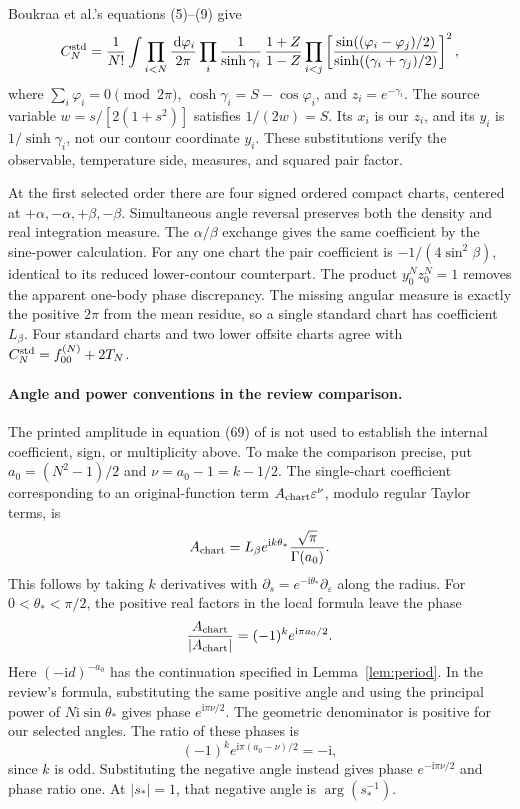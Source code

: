 \documentclass[11pt]{article}
\numberwithin{equation}{section}
\theoremstyle{definition}
\newcommand{\dd}{\,\mathrm d}
\newcommand{\ii}{\mathrm i}
\newcommand{\eps}{\varepsilon}
\begin{document}
Boukraa et al.'s equations (5)--(9) \cite{Boukraa2008} give
\[
 C_N^{\rm std}=\frac1{N!}
 \int\prod_{i<N}\frac{\dd\varphi_i}{2\pi}
 \prod_i\frac1{\sinh\gamma_i}\,
 \frac{1+Z}{1-Z}
 \prod_{i<j}\left[
  \frac{\sin((\varphi_i-\varphi_j)/2)}
       {\sinh((\gamma_i+\gamma_j)/2)}
             \right]^2 ,
\]
where \(\sum_i\varphi_i=0\pmod{2\pi}\),
\(\cosh\gamma_i=S-\cos\varphi_i\), and \(z_i=e^{-\gamma_i}\).
The source variable \(w=s/[2(1+s^2)]\) satisfies \(1/(2w)=S\).
Its \(x_i\) is our \(z_i\), and its \(y_i\) is
\(1/\sinh\gamma_i\), not our contour coordinate \(y_i\).
These substitutions verify the observable, temperature side,
measures, and squared pair factor.

At the first selected order there are four signed ordered compact
charts, centered at \(+\alpha,-\alpha,+\beta,-\beta\).
Simultaneous angle reversal preserves both the density and real
integration measure. The \(\alpha/\beta\) exchange gives the same
coefficient by the sine-power calculation.
For any one chart the pair coefficient is
\(-1/(4\sin^2\beta)\), identical to its reduced lower-contour
counterpart. The product \(y_0^Nz_0^N=1\) removes the apparent
one-body phase discrepancy. The missing angular measure is
exactly the positive \(2\pi\) from the mean residue, so a single
standard chart has coefficient \(L_\beta\). Four standard charts
and two lower offsite charts agree with
\(C_N^{\rm std}=f_{00}^{(N)}+2T_N\).

\paragraph{Angle and power conventions in the review comparison.}
The printed amplitude in equation (69) of \cite{McCoyMaillard2012}
is not used to establish the internal coefficient, sign, or
multiplicity above. To make the comparison precise, put
\(a_0=(N^2-1)/2\) and \(\nu=a_0-1=k-1/2\).
The single-chart coefficient corresponding to an original-function
term \(A_{\rm chart}\eps^\nu\), modulo regular Taylor terms, is
\[
 A_{\rm chart}=L_\beta e^{\ii k\theta_*}
                      \frac{\sqrt\pi}{\Gamma(a_0)}.
\]
This follows by taking \(k\) derivatives with
\(\partial_s=e^{-\ii\theta_*}\partial_\eps\) along the radius.
For \(0<\theta_*<\pi/2\), the positive real factors in the local
formula leave the phase
\[
 \frac{A_{\rm chart}}{|A_{\rm chart}|}
      =(-1)^k e^{\ii\pi a_0/2}.
\]
Here \((-\ii d)^{-a_0}\) has the continuation specified in
Lemma~\ref{lem:period}. In the review's formula, substituting the
same positive angle and using the principal power of
\(N\ii\sin\theta_*\) gives phase \(e^{\ii\pi\nu/2}\).
The geometric denominator is positive for our selected angles.
The ratio of these phases is
\[
 (-1)^k e^{\ii\pi(a_0-\nu)/2}=-\ii,
\]
since \(k\) is odd. Substituting the negative angle instead gives
phase \(e^{-\ii\pi\nu/2}\) and phase ratio one. At \(|s_*|=1\),
that negative angle is \(\arg(s_*^{-1})\).
\end{document}
